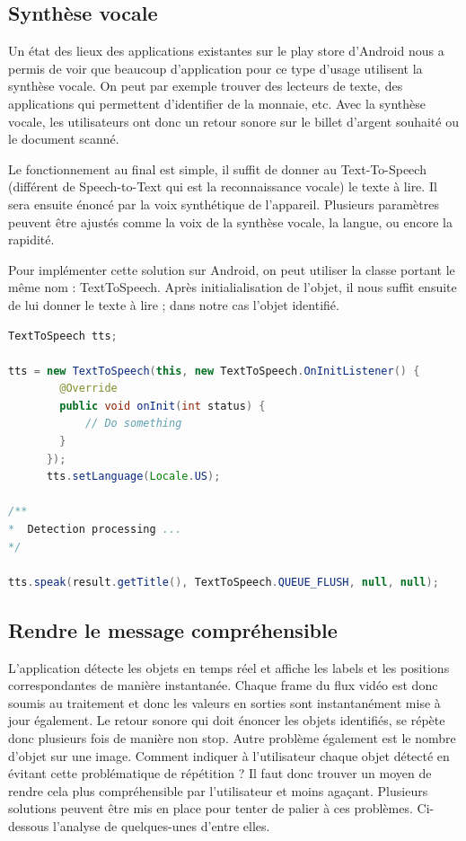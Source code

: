 \documentclass[UTF8]{EPURapport}
\begin{document}
\subsection{Synthèse vocale}
Un état des lieux des applications existantes sur le play store d'Android nous a permis de voir que beaucoup d'application pour ce type d'usage utilisent la synthèse vocale. On peut par exemple trouver des lecteurs de texte, des applications qui permettent d'identifier de la monnaie, etc. Avec la synthèse vocale, les utilisateurs ont donc un retour sonore sur le billet d'argent souhaité ou le document scanné.

Le fonctionnement au final est simple, il suffit de donner au Text-To-Speech (différent de Speech-to-Text qui est la reconnaissance vocale) le texte à lire. Il sera ensuite énoncé par la voix synthétique de l'appareil. Plusieurs paramètres peuvent être ajustés comme la voix de la synthèse vocale, la langue, ou encore la rapidité.

Pour implémenter cette solution sur Android, on peut utiliser la classe portant le même nom : TextToSpeech. Après initialialisation de l'objet, il nous suffit ensuite de lui donner le texte à lire ; dans notre cas l'objet identifié.

\newpage

\begin{lstlisting}[language=Java]
TextToSpeech tts;

tts = new TextToSpeech(this, new TextToSpeech.OnInitListener() {
        @Override
        public void onInit(int status) {
    		// Do something
        }
      });
      tts.setLanguage(Locale.US);

/**
*  Detection processing ...
*/

tts.speak(result.getTitle(), TextToSpeech.QUEUE_FLUSH, null, null);
\end{lstlisting}

\subsection{Rendre le message compréhensible}
L'application détecte les objets en temps réel et affiche les labels et les positions correspondantes de manière instantanée. Chaque frame du flux vidéo est donc soumis au traitement et donc les valeurs en sorties sont instantanément mise à jour également. Le retour sonore qui doit énoncer les objets identifiés, se répète donc plusieurs fois de manière non stop. Autre problème également est le nombre d'objet sur une image. Comment indiquer à l'utilisateur chaque objet détecté en évitant cette problématique de répétition ? Il faut donc trouver un moyen de rendre cela plus compréhensible par l'utilisateur et moins agaçant. Plusieurs solutions peuvent être mis en place pour tenter de palier à ces problèmes. Ci-dessous l'analyse de quelques-unes d'entre elles. 
\end{document}
